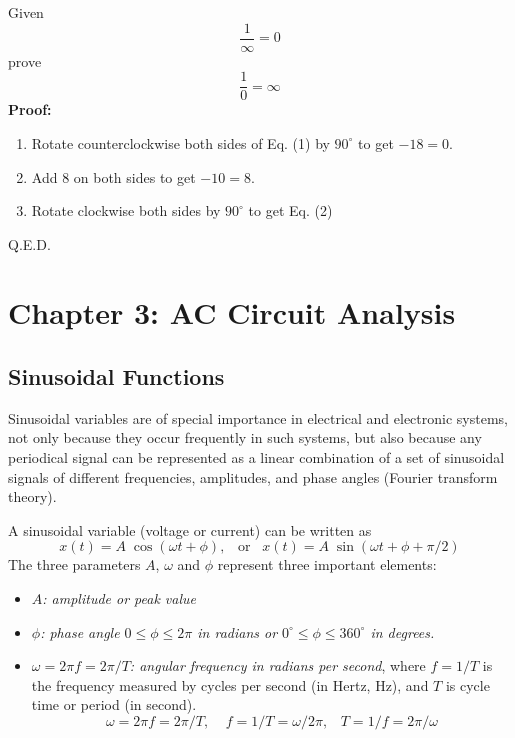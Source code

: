 \usepackage{html}
\textwidth 6.0in
\topmargin -0.5in
\oddsidemargin -0in
\evensidemargin -0.5in



Given 
\begin{equation}
  \frac{1}{\infty}=0
\end{equation}
prove
\begin{equation}
  \frac{1}{0}=\infty
\end{equation}
{\bf Proof:}
\begin{enumerate}
\item Rotate counterclockwise both sides of Eq. (1) by $90^\circ$
  to get $-18=0$.
\item Add $8$ on both sides to get $-10=8$.
\item Rotate clockwise both sides by $90^\circ$ to get Eq. (2)
\end{enumerate}
Q.E.D.

\section*{Chapter 3: AC Circuit Analysis}

\subsection*{Sinusoidal Functions}

Sinusoidal variables are of special importance in electrical and 
electronic systems, not only because they occur frequently in such 
systems, but also because any periodical signal can be represented 
as a linear combination of a set of sinusoidal signals of different 
frequencies, amplitudes, and phase angles (Fourier transform theory).

A sinusoidal variable (voltage or current) can be written as
\[
x(t)=A\;\cos(\omega t + \phi),\;\;\;\mbox{or}\;\;\;
x(t)=A\;\sin(\omega t+\phi+\pi/2) 
\]
The three parameters $A$, $\omega$ and $\phi$ represent three 
important elements:
\begin{itemize}
\item {\em $A$: amplitude or peak value}
\item {\em $\phi$: phase angle $0 \le \phi \le 2\pi$ in radians or
	$0^\circ \le \phi \le 360^\circ$ in degrees.}
\item {\em $\omega=2\pi f=2\pi/T$: angular frequency in radians per 
  second}, where $f=1/T$ is the frequency measured by cycles per
  second (in Hertz, Hz), and $T$ is cycle time or period (in second).
  \[
  \omega=2\pi f=2\pi/T,\;\;\;\;f=1/T=\omega/2\pi,\;\;\;T=1/f=2\pi/\omega 
  \]
\end{itemize}

